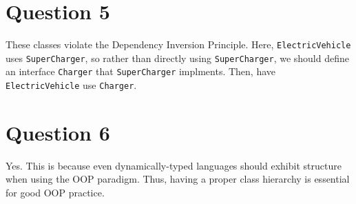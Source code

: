 \documentclass[13pt]{article}
\begin{document}
\section*{Question 5}
These classes violate the Dependency Inversion Principle. Here,
\texttt{ElectricVehicle} uses \texttt{SuperCharger}, so rather than
directly using \texttt{SuperCharger}, we should define an interface
\texttt{Charger} that \texttt{SuperCharger} implments. Then, have
\texttt{ElectricVehicle} use \texttt{Charger}.

\section*{Question 6}
Yes. This is because even dynamically-typed languages should exhibit
structure when using the OOP paradigm. Thus, having a proper class
hierarchy is essential for good OOP practice.
\end{document}
